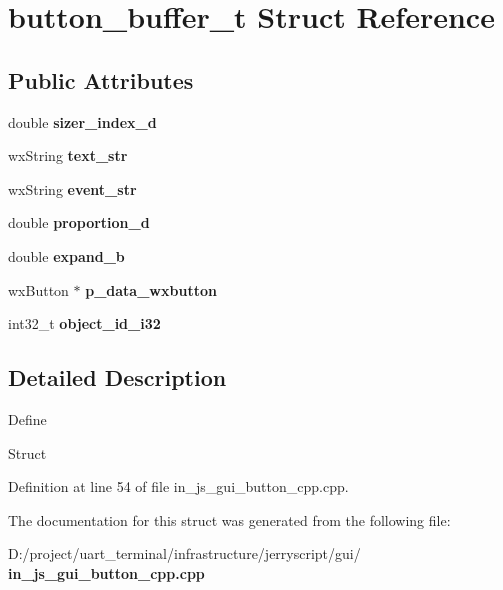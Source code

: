 \section{button\+\_\+buffer\+\_\+t Struct Reference}
\label{structbutton__buffer__t}
\subsection*{Public Attributes}
\begin{DoxyCompactItemize}
\item 
\mbox{\label{structbutton__buffer__t_a1d03bcd16572bf16e2948e65721df51a}} 
double {\bfseries sizer\+\_\+index\+\_\+d}
\item 
\mbox{\label{structbutton__buffer__t_a25bc0b4bfc97b3e2f6dc4753ad617a2f}} 
wx\+String {\bfseries text\+\_\+str}
\item 
\mbox{\label{structbutton__buffer__t_a1665b539f3b654453c80a4670cdd9335}} 
wx\+String {\bfseries event\+\_\+str}
\item 
\mbox{\label{structbutton__buffer__t_a0782821a617dd02d50d76b6fd0036b2b}} 
double {\bfseries proportion\+\_\+d}
\item 
\mbox{\label{structbutton__buffer__t_ab42ad545950d388aa4783f182961b740}} 
double {\bfseries expand\+\_\+b}
\item 
\mbox{\label{structbutton__buffer__t_a7a290c13f7bee8411d6b253543cc28a5}} 
wx\+Button $\ast$ {\bfseries p\+\_\+data\+\_\+wxbutton}
\item 
\mbox{\label{structbutton__buffer__t_ac9b45e05f564fac3c402776cf2cd8fb7}} 
int32\+\_\+t {\bfseries object\+\_\+id\+\_\+i32}
\end{DoxyCompactItemize}


\subsection{Detailed Description}
Define

Struct 

Definition at line 54 of file in\+\_\+js\+\_\+gui\+\_\+button\+\_\+cpp.\+cpp.



The documentation for this struct was generated from the following file\+:\begin{DoxyCompactItemize}
\item 
D\+:/project/uart\+\_\+terminal/infrastructure/jerryscript/gui/\textbf{ in\+\_\+js\+\_\+gui\+\_\+button\+\_\+cpp.\+cpp}\end{DoxyCompactItemize}
